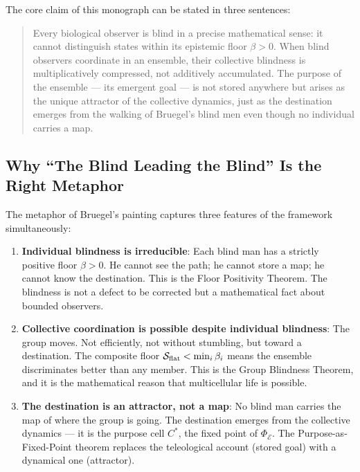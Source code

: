 The core claim of this monograph can be stated in three sentences:

\begin{quote}
Every biological observer is blind in a precise mathematical sense: it cannot
distinguish states within its epistemic floor $\beta > 0$.  When blind observers
coordinate in an ensemble, their collective blindness is multiplicatively
compressed, not additively accumulated.  The purpose of the ensemble — its
emergent goal — is not stored anywhere but arises as the unique attractor of
the collective dynamics, just as the destination emerges from the walking of
Bruegel's blind men even though no individual carries a map.
\end{quote}

\subsection{Why ``The Blind Leading the Blind'' Is the Right Metaphor}

The metaphor of Bruegel's painting captures three features of the framework
simultaneously:

\begin{enumerate}[leftmargin=2em]
  \item \textbf{Individual blindness is irreducible}: Each blind man has a
    strictly positive floor $\beta > 0$.  He cannot see the path; he cannot
    store a map; he cannot know the destination.  This is the Floor Positivity
    Theorem.  The blindness is not a defect to be corrected but a mathematical
    fact about bounded observers.

  \item \textbf{Collective coordination is possible despite individual blindness}:
    The group moves.  Not efficiently, not without stumbling, but toward a
    destination.  The composite floor $\mathcal{S}_{\mathrm{flat}} < \min_i \beta_i$
    means the ensemble discriminates better than any member.  This is the Group
    Blindness Theorem, and it is the mathematical reason that multicellular life
    is possible.

  \item \textbf{The destination is an attractor, not a map}: No blind man
    carries the map of where the group is going.  The destination emerges from
    the collective dynamics — it is the purpose cell $C^*$, the fixed point of
    $\Phi_\mathcal{E}$.  The Purpose-as-Fixed-Point theorem replaces the
    teleological account (stored goal) with a dynamical one (attractor).
\end{enumerate}

